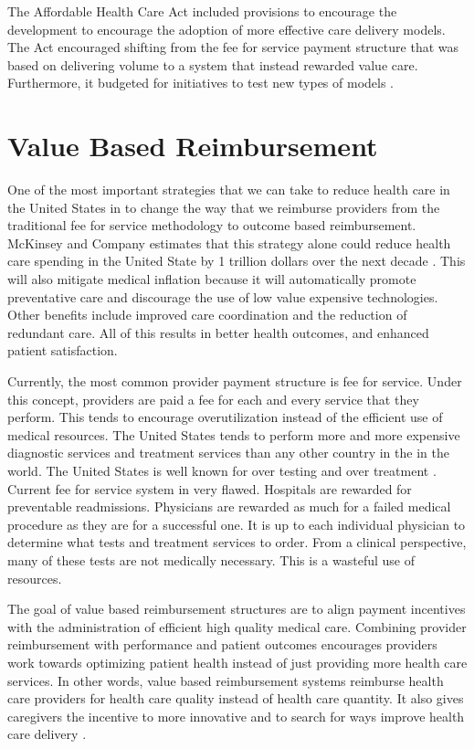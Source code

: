 \documentclass[sigconf]{acmart}
\begin{document}
The Affordable Health Care Act included provisions to encourage the development to encourage the adoption of more effective care delivery models. The Act encouraged shifting from the fee for service payment structure that was based on delivering volume to a system that instead rewarded value care. Furthermore, it budgeted for initiatives to test new types of models \cite{www-google-ACA}.  


\section{Value Based Reimbursement}
One of the most important strategies that we can take to reduce health care in the United States in to change the way that we reimburse providers from the traditional fee for service methodology to outcome based reimbursement.  McKinsey and Company estimates that this strategy alone could reduce health care spending in the United State by 1 trillion dollars over the next decade \cite{www-google-trillion}.  This will also mitigate medical inflation because it will automatically promote preventative care and discourage the use of low value expensive technologies.  Other benefits include   improved care coordination and the reduction of redundant care.  All of this results in better health outcomes, and enhanced patient satisfaction.

Currently, the most common provider payment structure is fee for service. Under this concept, providers are paid a fee for each and every service that they perform. This tends to encourage overutilization instead of the efficient use of medical resources. The United States tends to perform more and more expensive diagnostic services and treatment services than any other country in the in the world. The United States is well known for over testing and over treatment \cite{www-google-PBSO}.  Current fee for service system in very flawed. Hospitals are rewarded for preventable readmissions. Physicians are rewarded as much for a failed medical procedure as they are for a successful one.  It is up to each individual physician to determine what tests and treatment services to order.  From a clinical perspective, many of these tests are not medically necessary. This is a wasteful use of resources.

The goal of value based reimbursement structures are to align payment incentives with the administration of efficient high quality medical care. Combining provider reimbursement with performance and patient outcomes encourages providers work towards optimizing patient health instead of just providing more health care services. In other words, value based reimbursement systems reimburse health care providers for health care quality instead of health care quantity.   It also gives caregivers the incentive to more innovative and to search for ways improve health care delivery \cite{www-google-christian}.
\end{document}
